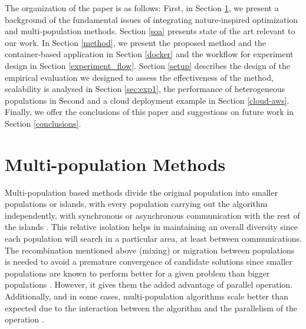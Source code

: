 \documentclass[review]{elsarticle}
\begin{document}
The organization of the paper is as follows: First, in Section \ref{multi}, we present a
background of the fundamental issues of integrating nature-inspired optimization
and multi-population methods. Section \ref{soa} presents state of the art relevant to
our work. In Section \ref{method}, we present the proposed method and the container-based
application in Section \ref{docker} and the workflow for experiment design in Section \ref{experiment_flow}. %
Section \ref{setup} describes
the design of the empirical evaluation we designed to assess the effectiveness
of the method, scalability is analysed in Section \ref{sec:exp1}, %
the performance of heterogeneous populations in Second \label{sec:exp2} 
and a cloud deployment example in Section \ref{cloud-aws}. %
Finally, we
offer the conclusions of this paper and suggestions on future work in Section \ref{conclusions}.


\section{Multi-population Methods} %
\label{multi}

Multi-population based methods divide the original population into
smaller populations or islands, with every population carrying out the
algorithm independently, with synchronous or asynchronous communication with the
rest of the islands \cite{Ma2019}.%
This relative isolation helps in maintaining an overall
diversity since each population will search in a particular area, at least
between communications. The recombination mentioned above (mixing) or migration
between populations is needed to avoid a premature convergence of candidate
solutions since smaller populations are known to perform better for a given
problem than bigger populations \cite{li2016multi,wu2016differential}. %
However, it gives them the added advantage of
parallel operation. Additionally, and in some cases, multi-population algorithms
scale better than expected due to the interaction between the algorithm and the
parallelism of the operation \cite{ALBA20027}. %
\end{document}

